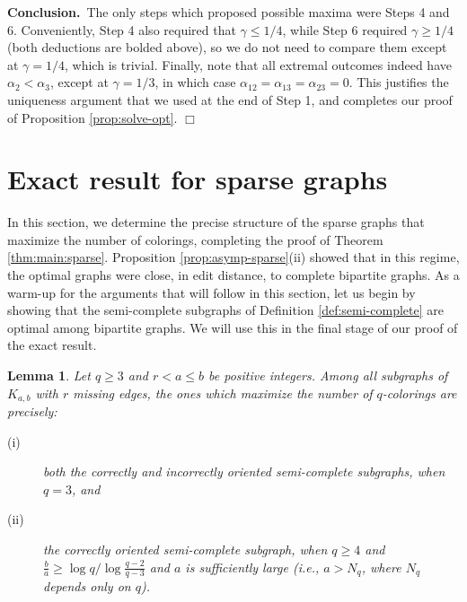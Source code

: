 \documentclass[11pt]{article}
\newtheorem{lemma}[theorem]{Lemma}
\begin{document}
\vspace{3mm}



\noindent \textbf{Conclusion.}\, The only steps which proposed
possible maxima were Steps 4 and 6.  Conveniently, Step 4 also
required that $\gamma \leq 1/4$, while Step 6 required $\gamma \geq
1/4$ (both deductions are bolded above), so we do not need to compare
them except at $\gamma = 1/4$, which is trivial.  Finally, note that
all extremal outcomes indeed have $\alpha_2 < \alpha_3$, except at
$\gamma = 1/3$, in which case $\alpha_{12} = \alpha_{13} = \alpha_{23}
= 0$.  This justifies the uniqueness argument that we used at the end
of Step 1, and completes our proof of Proposition
\ref{prop:solve-opt}. \hfill $\Box$




\section{Exact result for sparse graphs}
\label{sec:exact:sparse}

In this section, we determine the precise structure of the sparse
graphs that maximize the number of colorings, completing the proof of
Theorem \ref{thm:main:sparse}.  Proposition
\ref{prop:asymp-sparse}(ii) showed that in this regime, the optimal
graphs were close, in edit distance, to complete bipartite graphs.  As
a warm-up for the arguments that will follow in this section, let us
begin by showing that the semi-complete subgraphs of Definition
\ref{def:semi-complete} are optimal among bipartite graphs.  We will
use this in the final stage of our proof of the exact result.

\begin{lemma}
  \label{lem:semi-complete}
  Let $q \geq 3$ and $r < a \leq b$ be positive integers.  Among all
  subgraphs of $K_{a,b}$ with $r$ missing edges, the ones which
  maximize the number of $q$-colorings are precisely:
  \begin{description}
  \item[(i)] both the correctly and incorrectly oriented semi-complete
    subgraphs, when $q=3$, and
  \item[(ii)] the correctly oriented semi-complete subgraph, when $q
    \geq 4$ and $\frac{b}{a} \geq \log q / \log \frac{q-2}{q-3}$ and
    $a$ is sufficiently large (i.e., $a > N_q$, where $N_q$ depends
    only on $q$).
  \end{description}
\end{lemma}
\end{document}

